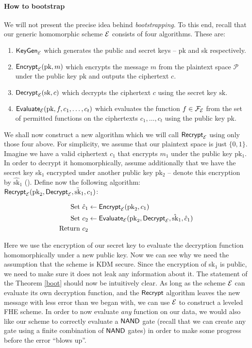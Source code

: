 \paragraph{How to bootstrap}
We will not present the precise idea behind \textit{bootstrapping}. To this end, recall that our generic homomorphic scheme $\mathcal{E}$ consists of four algorithms. These are:
\begin{enumerate}
	\item $\textsf{KeyGen}_{\mathcal{E}}$ which generates the public and secret keys -- pk and sk respectively.
	\item $\textsf{Encrypt}_{\mathcal{E}}(\text{pk}, m)$ which encrypts the message $m$ from the plaintext space $\mathcal{P}$ under the public key $\text{pk}$ and outputs the ciphertext $c$.
	\item $\textsf{Decrypt}_{\mathcal{E}}(\text{sk}, c)$ which decrypts the ciphertext $c$ using the secret key $\text{sk}$.
	\item $\textsf{Evaluate}_{\mathcal{E}}(\text{pk}, f, c_1, \ldots, c_t)$ which evaluates the function $f \in \mathcal{F}_{\mathcal{E}}$ from the set of permitted functions on the ciphertexts $c_1, \ldots, c_t$ using the public key pk.
\end{enumerate}
We shall now construct a new algorithm which we will call $\textsf{Recrypt}_{\mathcal{E}}$ using only those four above. For simplicity, we assume that our plaintext space is just $\{0,1\}$. Imagine we have a valid ciphertext $c_1$ that encrypts $m_1$ under the public key pk$_1$. In order to decrypt it homomorphically, assume additionally that we have the secret key sk$_1$ encrypted under another public key pk$_2$ -- denote this encryption by $\hat{\text{sk}}_1$ (). Define now the following algorithm:\\
$\textsf{Recrypt}_{\mathcal{E}}(\text{pk}_2, \textsf{Decrypt}_{\mathcal{E}}, \bar{\text{sk}}_1, c_1)$:


\begin{align*}
	\text{Set } \hat{c}_1 & \leftarrow \textsf{Encrypt}_{\mathcal{E}} (\text{pk}_2, c_1) \\
	\text{Set } c_2 & \leftarrow \textsf{Evaluate}_{\mathcal{E}} (\text{pk}_2, \textsf{Decrypt}_{\mathcal{E}}, \hat{\text{sk}}_1, \hat{c}_1) \\
	\text{Return } c_2 &
\end{align*}

Here we use the encryption of our secret key to evaluate the decryption function homomorphically under a new public key. Now we can see why we need the assumption that the scheme is KDM secure. Since the encryption of sk$_1$ is public, we need to make sure it does not leak any information about it. The statement of the Theorem \ref{boot} should now be intuitively clear. As long as the scheme $\mathcal{E}$ can evaluate its own decryption function, and the $\textsf{Recrypt}$ algorithm leaves the new message with less error than we began with, we can use $\mathcal{E}$ to construct a leveled FHE scheme. In order to now evaluate \textit{any} function on our data, we would also like our scheme to correctly evaluate a $\textsf{NAND}$ gate (recall that we can create any gate using a finite combination of $\textsf{NAND}$ gates) in order to make some progress before the error ``blows up''.

